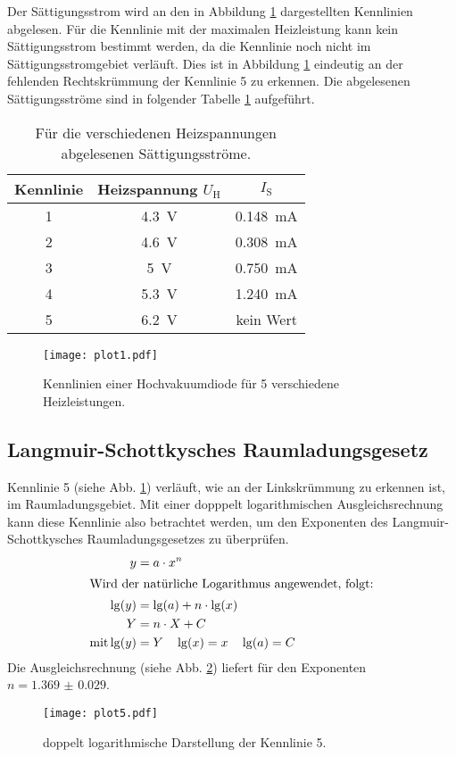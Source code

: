 Der Sättigungsstrom wird an den in Abbildung \ref{fig:plot1} dargestellten Kennlinien abgelesen.
Für die Kennlinie mit der maximalen Heizleistung kann kein Sättigungsstrom bestimmt werden, da die Kennlinie noch nicht im Sättigungsstromgebiet verläuft.
Dies ist in Abbildung \ref{fig:plot1} eindeutig an der fehlenden Rechtskrümmung der Kennlinie 5 zu erkennen.
Die abgelesenen Sättigungsströme sind in folgender Tabelle \ref{tab:a} aufgeführt.
\begin{table}
\centering
\caption{Für die verschiedenen Heizspannungen abgelesenen Sättigungsströme.}
\label{tab:a}
\begin{tabular}{c c c}
\toprule
Kennlinie & Heizspannung $U_\text{H}$ & $I_\text{S}$ \\
\midrule
1 & \SI{4.3}{\volt} & \SI{0.148}{\milli\ampere} \\
2 & \SI{4.6}{\volt} & \SI{0.308}{\milli\ampere} \\
3 & \SI{5}{\volt}   & \SI{0.750}{\milli\ampere} \\
4 & \SI{5.3}{\volt} & \SI{1.240}{\milli\ampere} \\
5 & \SI{6.2}{\volt} & kein Wert \\
\bottomrule
\end{tabular}
\end{table}
\begin{figure}
  \centering
  \texttt{[image: plot1.pdf]}
  \caption{Kennlinien einer Hochvakuumdiode für 5 verschiedene Heizleistungen.}
  \label{fig:plot1}
\end{figure}
\FloatBarrier

\subsection{Langmuir-Schottkysches Raumladungsgesetz}
\label{sec:expo}

Kennlinie 5 (siehe Abb. \ref{fig:plot1}) verläuft, wie an der Linkskrümmung zu erkennen ist, im Raumladungsgebiet.
Mit einer dopppelt logarithmischen Ausgleichsrechnung kann diese Kennlinie also betrachtet werden, um den Exponenten des Langmuir-Schottkysches Raumladungsgesetzes zu überprüfen.
\begin{align*}
   y &= a \cdot x^n \\
   \intertext{Wird der natürliche Logarithmus angewendet, folgt:}
   \lg(y) &= \lg(a) + n \cdot \lg(x) \\
   Y &= n \cdot X + C \\
   \text{mit} \lg(y) &= Y \quad \lg(x) = x \quad \lg(a) = C
\end{align*}
Die Ausgleichsrechnung (siehe Abb. \ref{fig:plot5}) liefert für den Exponenten $n = \num{1.369(29)}$.
\begin{figure}
  \centering
  \texttt{[image: plot5.pdf]}
  \caption{doppelt logarithmische Darstellung der Kennlinie 5.}
  \label{fig:plot5}
\end{figure}
\FloatBarrier

